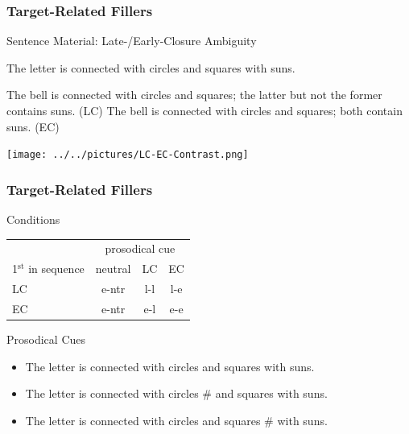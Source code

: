 \documentclass[fleqn,10pt,serif,xcolor=dvipsnames]{beamer}
\newcommand{\LC}{LC\xspace}
\newcommand{\EC}{EC\xspace}
\begin{document}
\begin{frame}
  \frametitle{Target-Related Fillers}
  \begin{block}{Sentence Material: Late-/Early-Closure Ambiguity}
    \begin{exe}
      \ex The letter is connected with circles and squares with
        suns.
        \begin{xlist}
          \ex The bell is connected with circles and squares; the latter
            but not the former contains suns. \hfill (\LC)
          \ex The bell is connected with circles and squares; both
            contain suns. \hfill (\EC)
        \end{xlist}
    \end{exe}
  \end{block}

  \begin{center}
    \texttt{[image: ../../pictures/LC-EC-Contrast.png]}
  \end{center}

\end{frame}

\begin{frame}
  \frametitle{Target-Related Fillers}

  \begin{block}{Conditions}
    \begin{center}
      \begin{tabular}{lccc}
        & \multicolumn{3}{c}{prosodical cue} \\ \cmidrule(r){2-4}
        1$^{\mathrm{st}}$ in sequence & neutral & \LC & \EC \\ \midrule
        \LC & e-ntr & l-l & l-e \\
        \EC & e-ntr & e-l & e-e \\
      \end{tabular}
    \end{center}
  \end{block}

  \begin{block}{Prosodical Cues}
    \begin{itemize}
      \item[ntr:] The letter is connected with circles and squares with
        suns.
      \item[LC:] The letter is connected with circles \# and squares with
        suns.
      \item[EC:] The letter is connected with circles and squares \# with
        suns.
    \end{itemize}
  \end{block}

\end{frame}
\end{document}
